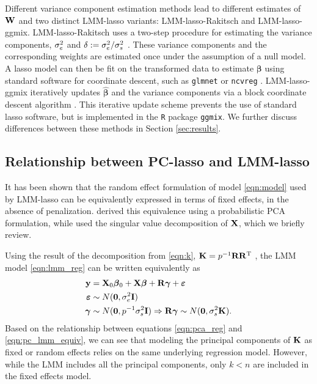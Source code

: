 Different variance component estimation methods lead to different estimates of $\mathbf{W}$ and two distinct LMM-lasso variants: LMM-lasso-Rakitsch and LMM-lasso-ggmix. LMM-lasso-Rakitsch uses a two-step procedure for estimating the variance components, $\sigma^2_e$ and $\delta := \sigma^2_e / \sigma^2_s$ \citep{Rakitsch2012}. These variance components and the corresponding weights are estimated once under the assumption of a null model. A lasso model can then be fit on the transformed data to estimate $\boldsymbol{\beta}$ using standard software for coordinate descent, such as \texttt{glmnet} \citep{glmnet} or \texttt{ncvreg} \citep{ncvreg}. LMM-lasso-ggmix iteratively updates $\widehat{\boldsymbol{\beta}}$ and the variance components via a block coordinate descent algorithm \citep{bhatnagar2020simultaneous}. This iterative update scheme prevents the use of standard lasso software, but is implemented in the \texttt{R} package \texttt{ggmix}. We further discuss differences between these methods in Section \ref{sec:results}.

\subsection{Relationship between PC-lasso and LMM-lasso}

It has been shown that the random effect formulation of model \eqref{eqn:model} used by LMM-lasso can be equivalently expressed in terms of fixed effects, in the absence of penalization. \citet{zhang2015principal} derived this equivalence using a probabilistic PCA formulation, while \citet{hoffman2013correcting} used the singular value decomposition of $\mathbf{X}$, which we briefly review.

Using the result of the decomposition from \eqref{eqn:k}, $\mathbf{K} = p^{-1} \mathbf{R} \mathbf{R}^{\text{T}}$ , the LMM model \eqref{eqn:lmm_reg} can be written equivalently as
\begin{equation}
  \begin{aligned}
    \label{eqn:pc_lmm_equiv}
    \mathbf{y} &= \mathbf{X}_0 \boldsymbol{\beta}{}_0 + \mathbf{X} \boldsymbol{\beta}{} + \mathbf{R} \boldsymbol{\gamma} + \boldsymbol{\varepsilon}{} \\
    \boldsymbol{\varepsilon}{} &\sim N(\boldsymbol{0}, \sigma^2_e \mathbf{I}) \\
    \boldsymbol{\gamma} &\sim N(\boldsymbol{0}, p^{-1} \sigma^2_s \mathbf{I}) \Rightarrow \mathbf{R} \boldsymbol{\gamma} \sim N(\boldsymbol{0}, \sigma^2_s \mathbf{K}).
  \end{aligned}
\end{equation}
Based on the relationship between equations \eqref{eqn:pca_reg} and \eqref{eqn:pc_lmm_equiv}, we can see that modeling the principal components of $\mathbf{K}$ as fixed or random effects relies on the same underlying regression model. However, while the LMM includes all the principal components, only $k < n$ are included in the fixed effects model. 

